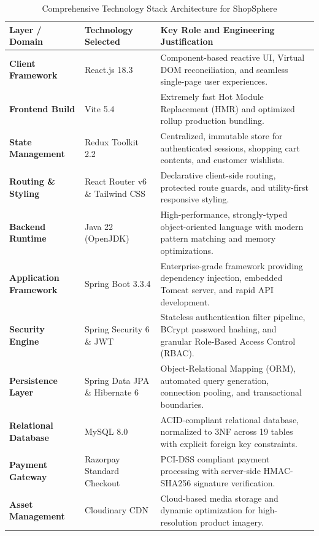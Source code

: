 \begin{table}[H]
\centering
\fontsize{10.5}{14}\selectfont
\begin{tabularx}{\textwidth}{|p{3.2cm}|p{3.8cm}|X|}
\hline
\textbf{Layer / Domain} & \textbf{Technology Selected} & \textbf{Key Role and Engineering Justification} \\
\hline
\textbf{Client Framework} & React.js 18.3 & Component-based reactive UI, Virtual DOM reconciliation, and seamless single-page user experiences. \\
\hline
\textbf{Frontend Build} & Vite 5.4 & Extremely fast Hot Module Replacement (HMR) and optimized rollup production bundling. \\
\hline
\textbf{State Management} & Redux Toolkit 2.2 & Centralized, immutable store for authenticated sessions, shopping cart contents, and customer wishlists. \\
\hline
\textbf{Routing \& Styling} & React Router v6 \& Tailwind CSS & Declarative client-side routing, protected route guards, and utility-first responsive styling. \\
\hline
\textbf{Backend Runtime} & Java 22 (OpenJDK) & High-performance, strongly-typed object-oriented language with modern pattern matching and memory optimizations. \\
\hline
\textbf{Application Framework} & Spring Boot 3.3.4 & Enterprise-grade framework providing dependency injection, embedded Tomcat server, and rapid API development. \\
\hline
\textbf{Security Engine} & Spring Security 6 \& JWT & Stateless authentication filter pipeline, BCrypt password hashing, and granular Role-Based Access Control (RBAC). \\
\hline
\textbf{Persistence Layer} & Spring Data JPA \& Hibernate 6 & Object-Relational Mapping (ORM), automated query generation, connection pooling, and transactional boundaries. \\
\hline
\textbf{Relational Database} & MySQL 8.0 & ACID-compliant relational database, normalized to 3NF across 19 tables with explicit foreign key constraints. \\
\hline
\textbf{Payment Gateway} & Razorpay Standard Checkout & PCI-DSS compliant payment processing with server-side HMAC-SHA256 signature verification. \\
\hline
\textbf{Asset Management} & Cloudinary CDN & Cloud-based media storage and dynamic optimization for high-resolution product imagery. \\
\hline
\end{tabularx}
\caption{Comprehensive Technology Stack Architecture for ShopSphere}
\label{tab:tech_stack}
\end{table}

